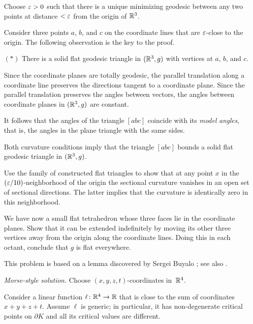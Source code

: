 Choose $\varepsilon>0$ such that there is a unique minimizing geodesic between any two points at distance $<\varepsilon$ from the origin of $\mathbb{R}^3$.

Consider three points $a$, $b$, and $c$ on the coordinate lines that are $\varepsilon$-close 
to the origin.
The following observation is the key to the proof.

\begin{cl}{$({*})$}
There is a solid flat geodesic triangle in $(\mathbb{R}^3,g)$ with vertices at $a$, $b$, and $c$.
\end{cl}

Since the coordinate planes are totally geodesic, 
the parallel translation along a coordinate line preserves the directions tangent to a coordinate plane.
Since the parallel translation preserves the angles between vectors, the angles between coordinate planes in $(\mathbb{R}^3,g)$ are constant.

It follows that the angles of the triangle $[abc]$ coincide with its \emph{model angles},
that is, the angles in the plane triangle with the same sides.

Both curvature conditions imply that the triangle $[abc]$ bounds a solid flat geodesic triangle in   $(\mathbb{R}^3,g)$.

Use the family of constructed flat triangles to show that at any point $x$ in the $(\varepsilon/10)$-neighborhood of the origin the sectional curvature vanishes in an open set of sectional directions.
The latter implies that the curvature is identically zero 
in this neighborhood.

We have now a small flat tetrahedron whose three faces lie in the coordinate planes.
Show that it can be extended indefinitely by moving its other three vertices away from the origin along the coordinate lines.
Doing this in each octant, conclude that $g$ is flat everywhere.
\qeds

This problem is based on a lemma discovered by Sergei Buyalo \cite[Lemma 5.8]{buyalo}; see also \cite{andersson-howard,panov-petrunin}.

\textit{Morse-style solution.}
Choose $(x,y,z,t)$-coordinates in~$\mathbb{R}^4$.

Consider a linear function $\ell\colon\mathbb{R}^4\to\mathbb{R}$ that is close to the sum of coordinates $x+y+z+t$.
Assume $\ell$ is generic; in particular, it has non-degenerate critical points on $\partial K$ and all its critical values are different.

